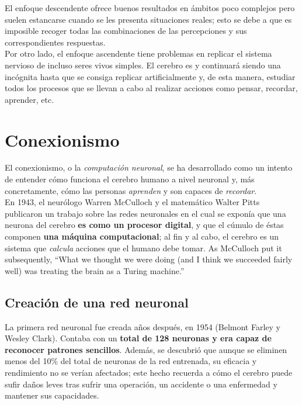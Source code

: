 El enfoque descendente ofrece buenos resultados en ámbitos poco complejos pero suelen estancarse cuando se les presenta situaciones reales; esto se debe a que es imposible recoger todas las combinaciones de las percepciones y sus correspondientes respuestas. \\

Por otro lado, el enfoque ascendente tiene problemas en replicar el sistema nervioso de incluso seres vivos simples. El cerebro es y continuará siendo una incógnita hasta que se consiga replicar artificialmente y, de esta manera, estudiar todos los procesos que se llevan a cabo al realizar acciones como pensar, recordar, aprender, etc. 

\section{Conexionismo}

El conexionismo, o la \textit{computación neuronal}, se ha desarrollado como un intento de entender cómo funciona el cerebro humano a nivel neuronal y, más concretamente, cómo las personas \textit{aprenden} y son capaces de \textit{recordar}. \\

En 1943, el neurólogo Warren McCulloch y el matemático Walter Pitts publicaron un trabajo sobre las redes neuronales en el cual se exponía que una neurona del cerebro \textbf{es como un procesor digital}, y que el cúmulo de éstas componen \textbf{una máquina computacional}; al fin y al cabo, el cerebro es un sistema que \textit{calcula} acciones que el humano debe tomar. As McCulloch put it subsequently, “What we thought we were doing (and I think we succeeded fairly well) was treating the brain as a Turing machine.”

\subsection{Creación de una red neuronal}

La primera red neuronal fue creada años después, en 1954 (Belmont Farley y Wesley Clark). Contaba con un \textbf{total de 128 neuronas y era capaz de reconocer patrones sencillos}. Además, se descubrió que aunque se eliminen menos del 10\% del total de neuronas de la red entrenada, su eficacia y rendimiento no se verían afectados; este hecho recuerda a cómo el cerebro puede sufir daños leves tras sufrir una operación, un accidente o una enfermedad y mantener sus capacidades. \\

